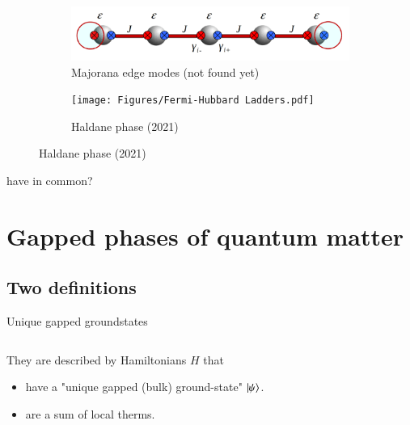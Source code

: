 \documentclass{beamer}
\begin{document}
\begin{frame}
	\begin{figure}
		\centering
		\begin{subfigure}[b]{0.4\textwidth}
			\centering
			\includegraphics[width=\textwidth]{Figures/MajoranaEdgeModes.png}
			\caption{Majorana edge modes (not found yet)}
		\end{subfigure}
		\hfill
		\begin{subfigure}[b]{0.4\textwidth}
			\centering
			\texttt{[image: Figures/Fermi-Hubbard Ladders.pdf]}
			\caption{Haldane phase (2021)}
		\end{subfigure}
	\end{figure}
	have in common?
\end{frame}

\section{Gapped phases of quantum matter}
\subsection{Two definitions}

\begin{frame}{Unique gapped groundstates}
	\begin{columns}
		\begin{column}{0.7\textwidth}
			They are described by Hamiltonians $H$ that
			\begin{itemize}
				\item<2-> have a "unique gapped (bulk) ground-state" $\ket{\psi}$.
				\item<3-> are a sum of local therms.
			\end{itemize}
		\end{column}
		\begin{column}{0.3\textwidth}
			\begin{center}
				
			\end{center}
		\end{column}
	\end{columns}
	
\end{frame}
\end{document}
